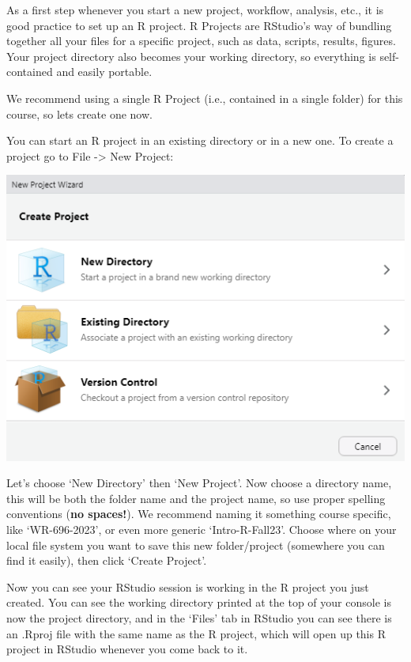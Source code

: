 \documentclass[
]{book}
\begin{document}
As a first step whenever you start a new project, workflow, analysis, etc., it is good practice to set up an R project. R Projects are RStudio's way of bundling together all your files for a specific project, such as data, scripts, results, figures. Your project directory also becomes your working directory, so everything is self-contained and easily portable.

We recommend using a single R Project (i.e., contained in a single folder) for this course, so lets create one now.

You can start an R project in an existing directory or in a new one. To create a project go to File -\textgreater{} New Project:

\includegraphics{images/project-start.png}

Let's choose `New Directory' then `New Project'. Now choose a directory name, this will be both the folder name and the project name, so use proper spelling conventions (\textbf{no spaces!}). We recommend naming it something course specific, like `WR-696-2023', or even more generic `Intro-R-Fall23'. Choose where on your local file system you want to save this new folder/project (somewhere you can find it easily), then click `Create Project'.

Now you can see your RStudio session is working in the R project you just created. You can see the working directory printed at the top of your console is now the project directory, and in the `Files' tab in RStudio you can see there is an .Rproj file with the same name as the R project, which will open up this R project in RStudio whenever you come back to it.
\end{document}
